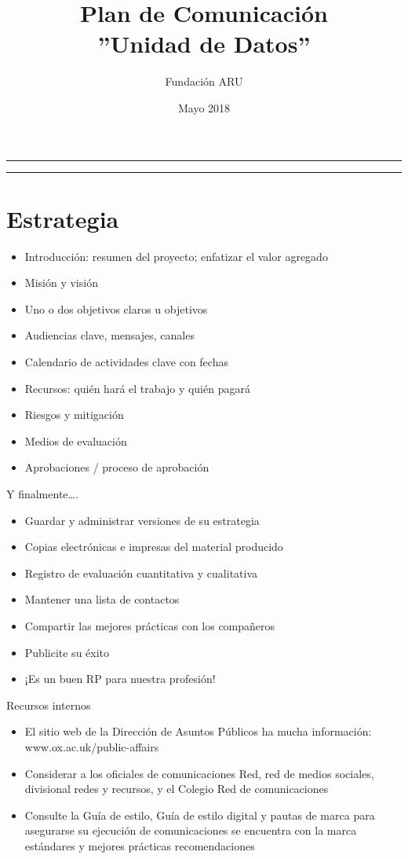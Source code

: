 \documentclass{article}
\title{\textbf{Plan de Comunicación} \\ ''Unidad de Datos''}
\author{Fundación ARU}
\date{Mayo 2018}
\begin{document}
\maketitle

\hrule
\hrule
\newpage

\section{Estrategia}

\begin{itemize}
\item Introducción: resumen del proyecto; enfatizar el valor agregado
\item Misión y visión
\item Uno o dos objetivos claros u objetivos
\item Audiencias clave, mensajes, canales
\item Calendario de actividades clave con fechas
\item Recursos: quién hará el trabajo y quién pagará
\item Riesgos y mitigación
\item Medios de evaluación
\item Aprobaciones / proceso de aprobación
\end{itemize}

Y finalmente….
\begin{itemize}
\item Guardar y administrar versiones de su estrategia
\item Copias electrónicas e impresas del material producido
\item Registro de evaluación cuantitativa y cualitativa
\item Mantener una lista de contactos
\item Compartir las mejores prácticas con los compañeros
\item Publicite su éxito
\item ¡Es un buen RP para nuestra profesión!
\end{itemize}

Recursos internos
\begin{itemize}
\item El sitio web de la Dirección de Asuntos Públicos ha mucha información:
www.ox.ac.uk/public-affairs
\item Considerar a los oficiales de comunicaciones Red, red de medios sociales, divisional redes y recursos, y el Colegio Red de comunicaciones
\item Consulte la Guía de estilo, Guía de estilo digital y pautas de marca para asegurarse su ejecución de comunicaciones se encuentra con la marca estándares y mejores prácticas recomendaciones
\end{itemize}
\end{document}
